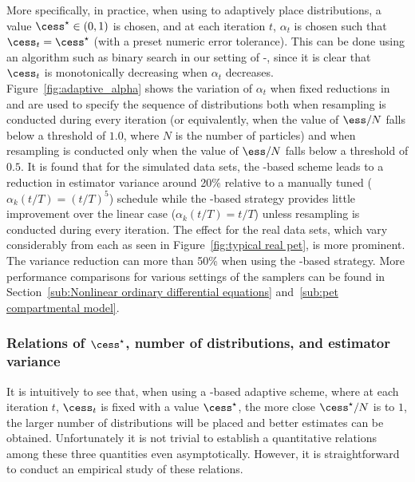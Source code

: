 More specifically, in practice, when using \cess to adaptively place
distributions, a value $\cess^\star \in (0, 1)$ is chosen, and at each
iteration $t$, $\alpha_t$ is chosen such that $\cess_t = \cess^\star$ (with a
preset numeric error tolerance). This can be done using an algorithm such as
binary search in our setting of \smc[1]-\smc[3], since it is clear that
$\cess_t$ is monotonically decreasing when $\alpha_t$ decreases.
Figure~\ref{fig:adaptive_alpha} shows the variation of $\alpha_t$ when fixed
reductions in \ess and \cess are used to specify the sequence of distributions
both when resampling is conducted during every iteration (or equivalently,
when the value of $\ess/N$ falls below a threshold of $1.0$, where $N$ is the
number of particles) and when resampling is conducted only when the value of
$\ess/N$ falls below a threshold of $0.5$. It is found that for the simulated
\pet data sets, the \cess-based scheme leads to a reduction in estimator
variance around 20\% relative to a manually tuned ($\alpha_k(t/T) = (t/T)^5$)
schedule while the \ess-based strategy provides little improvement over the
linear case ($\alpha_k(t/T) = t/T$) unless resampling is conducted during
every iteration. The effect for the real data sets, which vary considerably
from each as seen in Figure~\ref{fig:typical real pet}, is more prominent. The
variance reduction can more than 50\% when using the \cess-based strategy.
More performance comparisons for various settings of the samplers can be found
in Section~\ref{sub:Nonlinear ordinary differential equations}
and~\ref{sub:pet compartmental model}.

\subsubsection[Relations of cess*, number of distributions, and estimator
variance]
{Relations of $\cess^\star$, number of distributions, and estimator variance}
\label{ssub:Relations of cess*, number of distributions, and estimator
  variance}

It is intuitively to see that, when using a \cess-based adaptive scheme, where
at each iteration $t$, $\cess_t$ is fixed with a value $\cess^\star$, the more
close $\cess^\star/N$ is to $1$, the larger number of distributions will be placed
and better estimates can be obtained. Unfortunately it is not trivial to
establish a quantitative relations among these three quantities even
asymptotically. However, it is straightforward to conduct an empirical study
of these relations.

